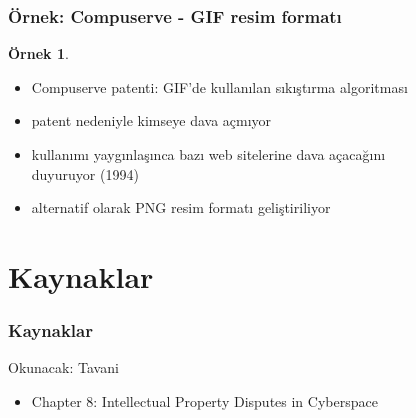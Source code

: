 \documentclass[dvipsnames]{beamer}
\theoremstyle{definition}
\theoremstyle{example}
\newtheorem{ornek}[theorem]{Örnek}
\theoremstyle{plain}
\begin{document}
\begin{frame}
  \frametitle{Örnek: Compuserve - GIF resim formatı}

  \begin{ornek}
    \begin{itemize}
      \item Compuserve patenti: GIF'de kullanılan sıkıştırma algoritması
      \item patent nedeniyle kimseye dava açmıyor
      \item kullanımı yaygınlaşınca bazı web sitelerine dava açacağını\\
        duyuruyor (1994)

      \pause
      \medskip
      \item alternatif olarak PNG resim formatı geliştiriliyor
    \end{itemize}
  \end{ornek}
\end{frame}

\section*{Kaynaklar}

\begin{frame}
  \frametitle{Kaynaklar}

  \begin{block}{Okunacak: Tavani}
    \begin{itemize}
      \item Chapter 8: \alert{Intellectual Property Disputes in Cyberspace}
    \end{itemize}
  \end{block}
\end{frame}
\end{document}
